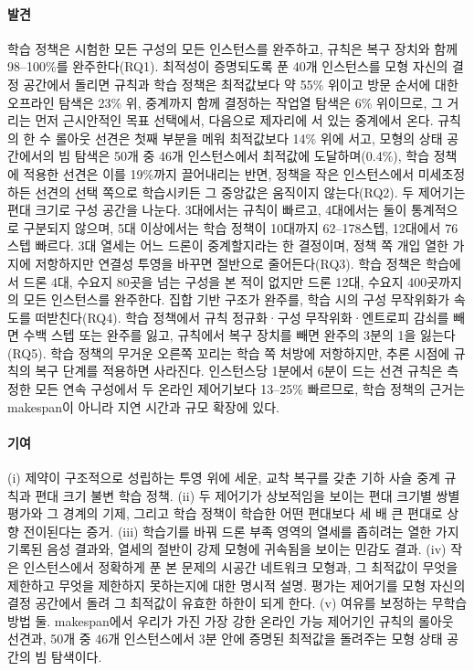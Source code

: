 \documentclass[final,5p,times,twocolumn]{elsarticle}
\begin{document}
\paragraph{발견}
학습 정책은 시험한 모든 구성의 모든 인스턴스를 완주하고, 규칙은 복구 장치와 함께
98--100\%를 완주한다(RQ1). 최적성이 증명되도록 푼 40개 인스턴스를 모형 자신의 결정 공간에서
돌리면 규칙과 학습 정책은 최적값보다 약 55\% 위이고 방문 순서에 대한 오프라인 탐색은 23\% 위,
중계까지 함께 결정하는 작업열 탐색은 6\% 위이므로, 그 거리는 먼저 근시안적인 목표 선택에서,
다음으로 제자리에 서 있는 중계에서 온다. 규칙의 한 수 롤아웃 선견은 첫째 부분을 메워 최적값보다
14\% 위에 서고, 모형의 상태 공간에서의 빔 탐색은 50개 중 46개 인스턴스에서 최적값에 도달하며(0.4\%),
학습 정책에 적용한 선견은 이를 19\%까지 끌어내리는 반면, 정책을 작은 인스턴스에서 미세조정하든
선견의 선택 쪽으로 학습시키든 그 중앙값은 움직이지 않는다(RQ2). 두 제어기는 편대
크기로 구성 공간을 나눈다. 3대에서는 규칙이 빠르고, 4대에서는 둘이 통계적으로 구분되지
않으며, 5대 이상에서는 학습 정책이 10대까지 62--178스텝, 12대에서 76스텝 빠르다. 3대 열세는 어느
드론이 중계할지라는 한 결정이며, 정책 쪽 개입 열한 가지에 저항하지만 연결성 투영을 바꾸면 절반으로
줄어든다(RQ3). 학습 정책은 학습에서 드론 4대, 수요지 80곳을 넘는 구성을 본 적이 없지만 드론 12대,
수요지 400곳까지의 모든 인스턴스를 완주한다. 집합 기반 구조가 완주를, 학습 시의 구성 무작위화가
속도를 떠받친다(RQ4). 학습 정책에서 규칙 정규화·구성 무작위화·엔트로피 감쇠를 빼면 수백 스텝 또는
완주를 잃고, 규칙에서 복구 장치를 빼면 완주의 3분의 1을 잃는다(RQ5). 학습 정책의 무거운 오른쪽
꼬리는 학습 쪽 처방에 저항하지만, 추론 시점에 규칙의 복구 단계를 적용하면 사라진다. 인스턴스당
1분에서 6분이 드는 선견 규칙은 측정한 모든 연속 구성에서 두 온라인 제어기보다 13--25\% 빠르므로,
학습 정책의 근거는 makespan이 아니라 지연 시간과 규모 확장에 있다.

\paragraph{기여}
(i) 제약이 구조적으로 성립하는 투영 위에 세운, 교착 복구를 갖춘 기하 사슬 중계 규칙과 편대 크기
불변 학습 정책. (ii) 두 제어기가 상보적임을 보이는 편대 크기별 쌍별 평가와 그 경계의 기제, 그리고
학습 정책이 학습한 어떤 편대보다 세 배 큰 편대로 상향 전이된다는 증거. (iii) 학습기를 바꿔 드론
부족 영역의 열세를 좁히려는 열한 가지 기록된 음성 결과와, 열세의 절반이 강제 모형에 귀속됨을
보이는 민감도 결과. (iv) 작은 인스턴스에서 정확하게 푼 본 문제의 시공간 네트워크 모형과, 그
최적값이 무엇을 제한하고 무엇을 제한하지 못하는지에 대한 명시적 설명. 평가는 제어기를 모형 자신의
결정 공간에서 돌려 그 최적값이 유효한 하한이 되게 한다. (v) 여유를 보정하는 무학습 방법 둘. makespan에서
우리가 가진 가장 강한 온라인 가능 제어기인 규칙의 롤아웃 선견과, 50개 중 46개 인스턴스에서 3분 안에
증명된 최적값을 돌려주는 모형 상태 공간의 빔 탐색이다.
\end{document}

